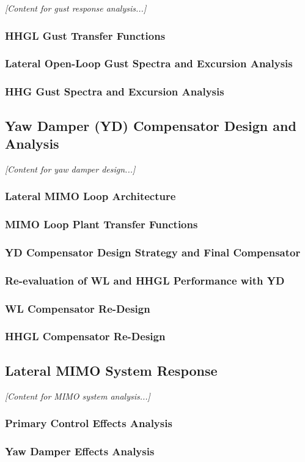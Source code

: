 \textit{[Content for gust response analysis...]}

\subsubsection{HHGL Gust Transfer Functions}

\subsubsection{Lateral Open-Loop Gust Spectra and Excursion Analysis}

\subsubsection{HHG Gust Spectra and Excursion Analysis}

\subsection{Yaw Damper (YD) Compensator Design and Analysis}

\textit{[Content for yaw damper design...]}

\subsubsection{Lateral MIMO Loop Architecture}

\subsubsection{MIMO Loop Plant Transfer Functions}

\subsubsection{YD Compensator Design Strategy and Final Compensator}

\subsubsection{Re-evaluation of WL and HHGL Performance with YD}

\subsubsection{WL Compensator Re-Design}

\subsubsection{HHGL Compensator Re-Design}

\subsection{Lateral MIMO System Response}

\textit{[Content for MIMO system analysis...]}

\subsubsection{Primary Control Effects Analysis}

\subsubsection{Yaw Damper Effects Analysis}
